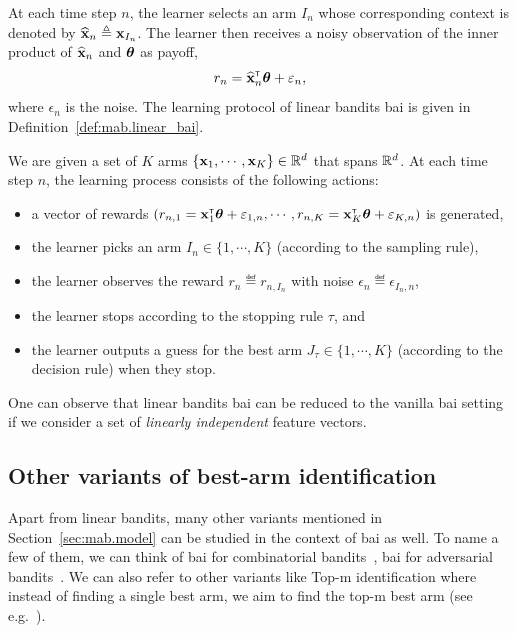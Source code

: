 At each time step $n$, the learner selects an arm $I_n$ whose corresponding context is denoted by $\widehat{{\bf x}}_n\triangleq {\bf x}_{I_n}$. The learner then receives a noisy observation of the inner product of $\widehat{{\bf x}}_n$ and ${\boldsymbol \theta}$ as payoff,
\[
    r_n = \widehat{{\bf x}}_n^\mathsf{\scriptscriptstyle T}{\boldsymbol \theta} + \varepsilon_n,
\]
where $\epsilon_n$ is the noise. The learning protocol of linear bandits \gls{bai} is given in Definition~\ref{def:mab.linear_bai}.

\begin{definition}\label{def:mab.linear_bai}
\begin{leftbar}[defnbar]
	We are given a set of $K$ arms $\{{\bf x}_1,\cdots,{\bf x}_K\}\in\mathbb{R}^d$ that spans $\mathbb{R}^d$. At each time step $n$, the learning process consists of the following actions:
\begin{itemize}
	\item a vector of rewards $(r_{n,1} = {\bf x}_1^\mathsf{\scriptscriptstyle T}{\boldsymbol \theta}+\varepsilon_{1,n}, \cdots, r_{n,K} = {\bf x}_K^\mathsf{\scriptscriptstyle T}{\boldsymbol \theta}+\varepsilon_{K,n})$ is generated,
	\item the learner picks an arm $I_n \in \{1,\cdots,K\}$ (according to the sampling rule),
	\item the learner observes the reward $r_n \eqdef r_{n,I_n}$ with noise $\epsilon_n \eqdef \epsilon_{I_n,n}$,
	\item the learner stops according to the stopping rule $\tau$, and
	\item the learner outputs a guess for the best arm $J_\tau \in \{1,\cdots,K\}$ (according to the decision rule) when they stop.
\end{itemize}
\end{leftbar}
\end{definition}

\begin{remark}\label{remark:mab.reduction}
\begin{leftbar}[remarkbar]
    One can observe that linear bandits \gls{bai} can be reduced to the vanilla \gls{bai} setting if we consider a set of \emph{linearly independent} feature vectors.
\end{leftbar}
\end{remark}

\subsection{Other variants of best-arm identification}\label{sec:mab.extensions.other}

Apart from linear bandits, many other variants mentioned in Section~\ref{sec:mab.model} can be studied in the context of \gls{bai} as well. To name a few of them, we can think of \gls{bai} for combinatorial bandits~\citep{chen2021combinatorial}, \gls{bai} for adversarial bandits~\citep{abbasi-yadkori2018best}. We can also refer to other variants like Top-m identification where instead of finding a single best arm, we aim to find the top-m best arm (see e.g.~\citealt{kalyanakrishnan2010,reda2021topm}).

